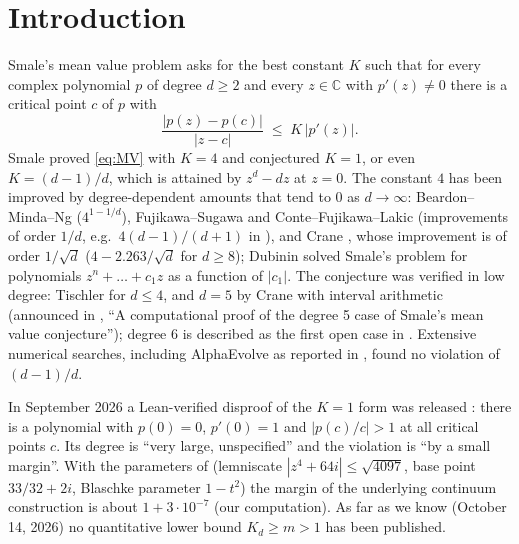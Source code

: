 \documentclass[11pt]{article}
\numberwithin{equation}{section}
\theoremstyle{definition}
\theoremstyle{remark}
\newcommand{\C}{\mathbb C}
\begin{document}
\section{Introduction}
Smale's mean value problem \cite{Smale81} asks for the best constant $K$ such that for every complex
polynomial $p$ of degree $d\ge2$ and every $z\in\C$ with $p'(z)\neq0$ there is a critical point $c$
of $p$ with
\begin{equation}\label{eq:MV}
  \frac{|p(z)-p(c)|}{|z-c|}\;\le\;K\,|p'(z)| .
\end{equation}
Smale proved \eqref{eq:MV} with $K=4$ and conjectured $K=1$, or even $K=(d-1)/d$, which is attained by
$z^d-dz$ at $z=0$. The constant $4$ has been improved by degree-dependent amounts that tend to $0$ as
$d\to\infty$: Beardon--Minda--Ng \cite{BMN02} ($4^{1-1/d}$), Fujikawa--Sugawa \cite{FS06} and
Conte--Fujikawa--Lakic \cite{CFL07} (improvements of order $1/d$, e.g.\ $4(d-1)/(d+1)$ in \cite{CFL07}), and
Crane \cite{Crane07}, whose improvement is of order $1/\sqrt d$ ($4-2.263/\sqrt d$ for $d\ge8$);
Dubinin \cite{Dubinin06} solved Smale's problem for polynomials $z^n+\dots+c_1z$ as a function of
$|c_1|$. The conjecture was verified in low degree: Tischler \cite{Tischler89} for $d\le4$, and
$d=5$ by Crane with interval arithmetic (announced in \cite{Crane06}, ``A computational proof of the
degree 5 case of Smale's mean value conjecture''); degree $6$ is described as the first open case in
\cite{Liu26}. Extensive numerical searches, including AlphaEvolve as reported in \cite{JatarNg26}, found
no violation of $(d-1)/d$.

In September 2026 a Lean-verified disproof of the $K=1$ form was released \cite{GPT6}: there is a
polynomial with $p(0)=0$, $p'(0)=1$ and $|p(c)/c|>1$ at all critical points $c$. Its degree is
``very large, unspecified'' and the violation is ``by a small margin''. With the parameters of
\cite{GPT6} (lemniscate $|z^4+64i|\le\sqrt{4097}$, base point $33/32+2i$, Blaschke parameter
$1-t^2$) the margin of the underlying continuum construction is about $1+3\cdot10^{-7}$ (our
computation). As far as we know (October 14, 2026) no quantitative lower bound $K_d\ge m>1$ has been
published.
\end{document}
